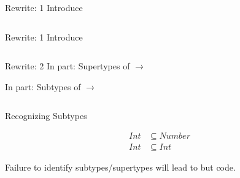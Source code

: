 \begin{frame}{Rewrite: 1}
  Introduce \colorbox{pink!30}{}

  \begin{columns}
    \begin{column}{0.5\textwidth}
      \usebox\typecaseAbox
    \end{column}
    \begin{column}{0.5\textwidth}  %
      \usebox\typecaseBabox
    \end{column}    
  \end{columns}
\end{frame}

\begin{frame}{Rewrite: 1}
  Introduce \colorbox{pink!30}{}

  \begin{columns}
    \begin{column}{0.5\textwidth}
      \usebox\typecaseAbox
    \end{column}
    \begin{column}{0.5\textwidth}  %
      \usebox\typecaseBbox
    \end{column}    
  \end{columns}
\end{frame}




\begin{frame}{Rewrite: 2}
  In  part: \colorbox{pink!30}{Supertypes of  $\to$  }
  
  In  part: \colorbox{pink!30}{Subtypes of  $\to$ }

  \begin{columns}
    \begin{column}{0.5\textwidth}
      \usebox\typecaseBbox
    \end{column}
    \begin{column}{0.5\textwidth}  %
      \usebox\typecaseChbox
    \end{column}    
  \end{columns}
\end{frame}


\begin{frame}{Recognizing Subtypes}
  \centering

  \begin{align*}
    Int&\subseteq Number\\
    Int&\subseteq Int
  \end{align*}

  \scalebox{0.8}{}


  Failure to identify subtypes/supertypes will lead to  but  code.
\end{frame}




